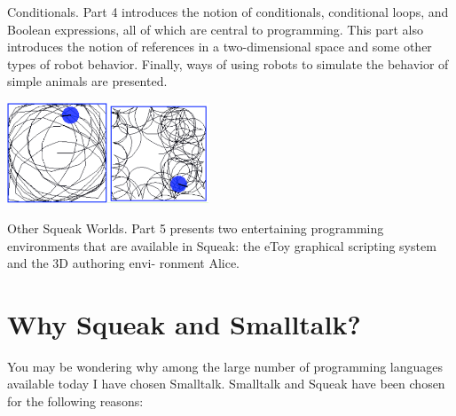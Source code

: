 \documentclass[a4paper,10pt,twoside]{book}
\begin{document}
\begin{description}
	\item Conditionals. Part 4 introduces the notion of conditionals, conditional loops, and Boolean 
	expressions, all of which are central to programming. This part also introduces the notion of 
	references in a two-dimensional space and some other types of robot behavior. Finally, 
	ways of using robots to simulate the behavior of simple animals are presented. 
	
	\begin{center}
	\includegraphics[width=3cm]{4-followBorder2}\includegraphics[width=3cm]{5-oppositeBorderOfBox}
	\end{center}


\item Other Squeak Worlds. Part 5 presents two entertaining programming environments that 
are available in Squeak: the eToy graphical scripting system and the 3D authoring envi- 
ronment Alice. 

\end{description}

\section*{Why Squeak and Smalltalk?}
You may be wondering why among the large number of programming languages available today 
I have chosen Smalltalk. Smalltalk and Squeak have been chosen for the following reasons: 
\end{document}
